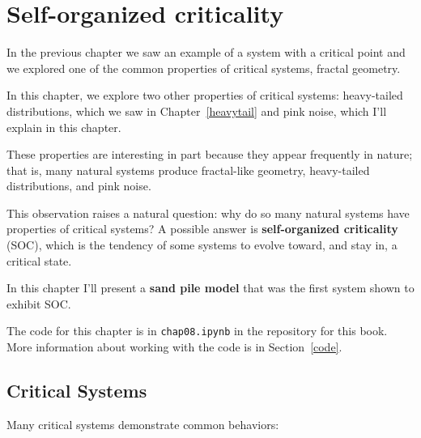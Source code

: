 \documentclass[12pt]{book}
\theoremstyle{exercise}
\begin{document}
\chapter{Self-organized criticality}
\label{soc}

In the previous chapter we saw an example of a system with a critical
point and we explored one of the common properties of critical
systems, fractal geometry.



In this chapter, we explore two other properties of critical systems:
heavy-tailed distributions, which we saw in Chapter~\ref{heavytail}
and pink noise, which I'll explain in this chapter.

These properties are interesting in part because they appear
frequently in nature; that is, many natural systems produce
fractal-like geometry, heavy-tailed distributions, and pink noise.

This observation raises a natural question: why do so many natural
systems have properties of critical systems?  A possible answer is
{\bf self-organized criticality} (SOC), which is the tendency of some
systems to evolve toward, and stay in, a critical state.


In this chapter I'll present a {\bf sand pile model} that was the
first system shown to exhibit SOC.

The code for this chapter is in {\tt chap08.ipynb} in the repository
for this book.  More information about working with the code is
in Section~\ref{code}.


\section{Critical Systems}

Many critical systems demonstrate common behaviors:
\end{document}
